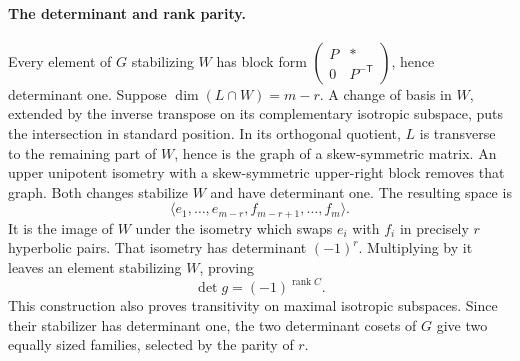 \paragraph{The determinant and rank parity.}
Every element of $G$ stabilizing $W$ has block form
\(
 \left(\begin{smallmatrix}P&*\\0&P^{-\mathsf T}\end{smallmatrix}\right)
\), hence determinant one.
Suppose $\dim(L\cap W)=m-r$. A change of basis in $W$, extended by the
inverse transpose on its complementary isotropic subspace, puts the
intersection in standard position. In its orthogonal quotient, $L$ is
transverse to the remaining part of $W$, hence is the graph of a
skew-symmetric matrix. An upper unipotent isometry with a skew-symmetric
upper-right block removes that graph. Both changes stabilize $W$ and
have determinant one. The resulting space is
\[
 \langle e_1,\ldots,e_{m-r},f_{m-r+1},\ldots,f_m\rangle.
\]
It is the image of $W$ under the isometry which swaps $e_i$ with $f_i$
in precisely $r$ hyperbolic pairs. That isometry has determinant
$(-1)^r$. Multiplying by it leaves an element stabilizing $W$, proving
\begin{equation}
 \det g=(-1)^{\operatorname{rank}C}.
 \label{eq:orthogonal-parity}
\end{equation}
This construction also proves transitivity on maximal isotropic
subspaces. Since their stabilizer has determinant one, the two determinant
cosets of $G$ give two equally sized families, selected by the parity
of $r$.

